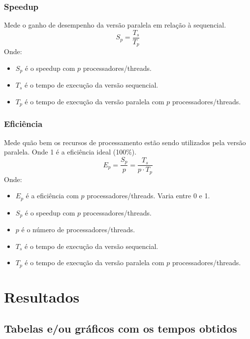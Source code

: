 \documentclass[12pt, a4paper]{article}
\begin{document}
	\subsubsection{Speedup}
	Mede o ganho de desempenho da versão paralela em relação à sequencial.
	\[
		S_{p} = \frac{T_{s}}{T_{p}}
	\]
	Onde:
	\begin{itemize}
		\item $S_{p}$ é o speedup com $p$ processadores/threads.

		\item $T_{s}$ é o tempo de execução da versão sequencial.

		\item $T_{p}$ é o tempo de execução da versão paralela com $p$ processadores/threads.
	\end{itemize}

	\subsubsection{Eficiência}
    Mede quão bem os recursos de processamento estão sendo utilizados pela versão paralela. Onde 1 é a eficiência ideal (100\%).
	\[
		E_{p} = \frac{S_{p}}{p}= \frac{T_{s}}{p \cdot T_{p}}
	\]
	Onde:
	\begin{itemize}
		\item $E_{p}$ é a eficiência com $p$ processadores/threads. Varia entre 0 e 1.

		\item $S_{p}$ é o speedup com $p$ processadores/threads.

        \item $p$ é o número de processadores/threads.

        \item $T_{s}$ é o tempo de execução da versão sequencial.

        \item $T_{p}$ é o tempo de execução da versão paralela com $p$ processadores/threads.
	\end{itemize}

	\section{Resultados}

	\subsection{Tabelas e/ou gráficos com os tempos obtidos}
\end{document}

